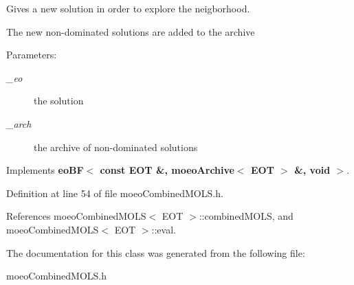 Gives a new solution in order to explore the neigborhood. 

The new non-dominated solutions are added to the archive \begin{Desc}
\item[Parameters:]
\begin{description}
\item[{\em \_\-eo}]the solution \item[{\em \_\-arch}]the archive of non-dominated solutions \end{description}
\end{Desc}


Implements {\bf eo\-BF$<$ const EOT \&, moeo\-Archive$<$ EOT $>$ \&, void $>$}.

Definition at line 54 of file moeo\-Combined\-MOLS.h.

References moeo\-Combined\-MOLS$<$ EOT $>$::combined\-MOLS, and moeo\-Combined\-MOLS$<$ EOT $>$::eval.

The documentation for this class was generated from the following file:\begin{CompactItemize}
\item 
moeo\-Combined\-MOLS.h\end{CompactItemize}
